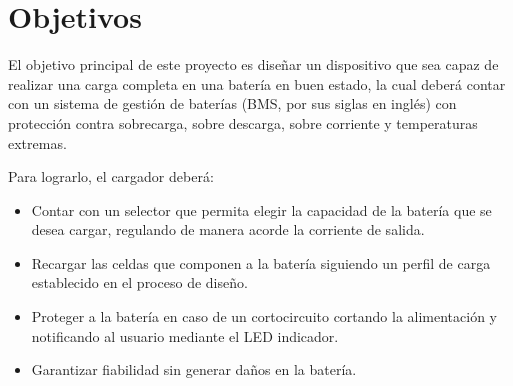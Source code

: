 \section{Objetivos}

El objetivo principal de este proyecto es diseñar un dispositivo que sea capaz de realizar una carga completa en una batería 
en buen estado, la cual deberá contar con un sistema de gestión de baterías (BMS, por sus siglas en inglés)
con protección contra sobrecarga, sobre descarga, sobre corriente y temperaturas extremas.

Para lograrlo, el cargador deberá:
\begin{itemize}
    \item Contar con un selector que permita elegir la capacidad de la batería que se desea cargar, regulando de manera acorde la corriente de salida.
    \item Recargar las celdas que componen a la batería siguiendo un perfil de carga establecido en el proceso de diseño.
    \item Proteger a la batería en caso de un cortocircuito cortando la alimentación y notificando al usuario mediante el LED indicador.
    \item Garantizar fiabilidad sin generar daños en la batería.
\end{itemize}